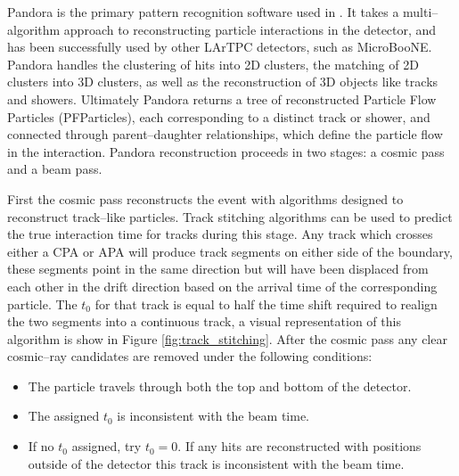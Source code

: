 Pandora\cite{Marshall2015} is the primary pattern recognition software used in
\protodune{}. It takes a multi--algorithm approach to reconstructing particle
interactions in the detector, and has been successfully used by other LArTPC
detectors, such as MicroBooNE\cite{Acciarri:2017hat}. Pandora handles the 
clustering of hits into 2D clusters, the matching of 2D clusters into 3D
clusters, as well as the reconstruction of 3D objects like tracks and 
showers. Ultimately Pandora returns a tree of reconstructed Particle Flow
Particles (PFParticles), each corresponding to a distinct track or shower, and 
connected through parent--daughter relationships, which define the particle flow
in the interaction. Pandora reconstruction proceeds in two stages: a cosmic 
pass and a beam pass. 


First the cosmic pass reconstructs the event with algorithms designed to 
reconstruct track--like particles. Track stitching algorithms can be used to
predict the true interaction time for tracks during this stage. Any track which 
crosses either a CPA or APA will produce track segments on either side of the 
boundary, these segments point in the same direction but will have been 
displaced from each other in the drift direction based on the arrival time of 
the corresponding particle. The $t_0$ for that track is equal to half the time 
shift required to realign the two segments into a continuous track, a visual
representation of this algorithm is show in Figure \ref{fig:track_stitching}. 
After the cosmic pass any clear cosmic--ray candidates are removed under the 
following conditions\cite{protoduneperf}:
\begin{itemize}
	\item The particle travels through both the top and bottom of the detector.
	\item The assigned $t_0$ is inconsistent with the beam time.
	\item If no $t_0$ assigned, try $t_0 = 0$. If any hits are reconstructed 
		with positions outside of the detector this track is inconsistent with the 
		beam time.
\end{itemize}

